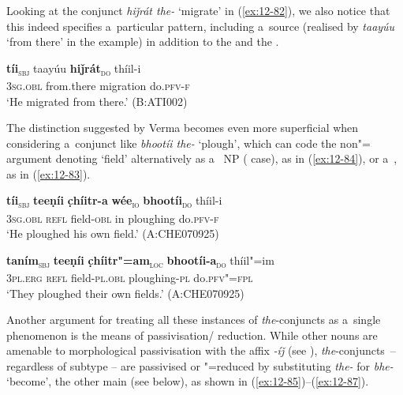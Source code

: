 \begin{exe}
Looking at the conjunct \textit{hiǰrát the-} `migrate' in (\ref{ex:12-82}), we also notice that this indeed specifies a~particular  pattern, including a~source (realised by \textit{taayúu} `from there' in the example) in addition to the  and the . 

\begin{exe}
\ex
\label{ex:12-82}
\gll {\ob}\textbf{tíi}{\cb}\textsubscript{\textsc{\upshape sbj}} taayúu {\ob}\textbf{hiǰrát}{\cb}\textsubscript{\textsc{\upshape do}} thíil-i\\
\textsc{3sg.obl} from.there migration do.\textsc{pfv-f}\\
\glt `He migrated from there.' (B:ATI002)
\end{exe}

The distinction suggested by Verma becomes even more superficial when considering a~conjunct like \textit{bhootíi the-} `plough', which can code the non"= argument denoting `field' alternatively as a~ NP ( case), as in (\ref{ex:12-84}), or a~, as in (\ref{ex:12-83}).

\begin{exe}
\ex
\label{ex:12-83}
\gll {\ob}\textbf{tíi}{\cb}\textsubscript{\textsc{\upshape sbj}} {\ob}\textbf{teeṇíi} \textbf{c̣híitr-a} \textbf{wée}{\cb}\textsubscript{\textsc{\upshape io}} {\ob}\textbf{bhootíi}{\cb}\textsubscript{\textsc{\upshape do}} thíil-i\\
\textsc{3sg.obl} \textsc{refl} field-\textsc{obl} in ploughing do.\textsc{pfv-f}\\
\glt `He ploughed his own field.' (A:CHE070925)
\end{exe}
\begin{exe}
\ex
\label{ex:12-84}
\gll {\ob}\textbf{taním}{\cb}\textsubscript{\textsc{\upshape sbj}} {\ob}\textbf{teeṇíi} \textbf{c̣híitr"=am}{\cb}\textsubscript{\textsc{\upshape loc}} {\ob}\textbf{bhootíi-a}{\cb}\textsubscript{\textsc{\upshape do}} thíil"=im\\
\textsc{3pl.erg} \textsc{refl} field-\textsc{pl.obl} ploughing-\textsc{pl} do.\textsc{pfv"=fpl} \\
\glt `They ploughed their own fields.' (A:CHE070925)
\end{exe}

Another argument for treating all these instances of \textit{the}-conjuncts as a~single phenomenon is the means of passivisation/ reduction. While other  nouns are amenable to morphological passivisation with the affix \textit{-íǰ} (see ), \textit{the}-conjuncts~-- regardless of subtype -- are passivised or "=reduced by substituting \textit{the-} for \textit{bhe-} `become', the other main  (see below), as shown in (\ref{ex:12-85})--(\ref{ex:12-87}).


\end{exe}
